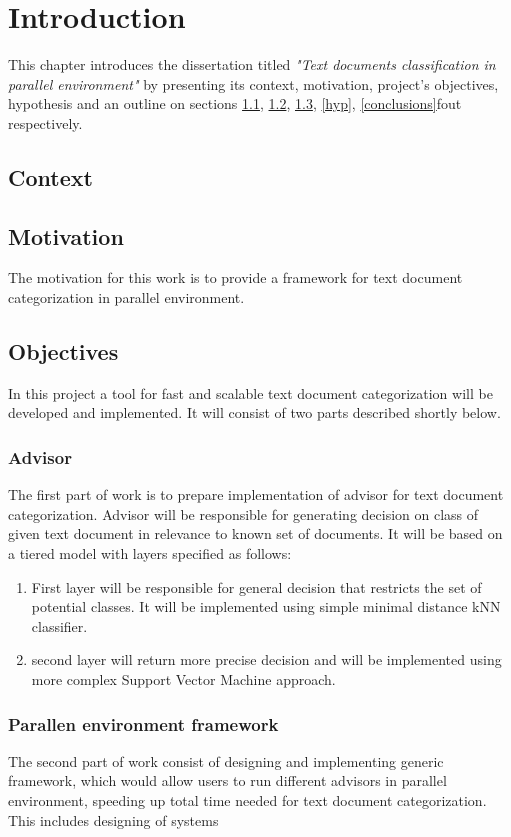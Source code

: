 \chapter{Introduction}
\label{int}

This chapter introduces the dissertation titled \textit{"Text documents classification in parallel environment"} by presenting its context, motivation, project’s objectives, hypothesis and an outline on sections \ref{con}, \ref{mot}, \ref{obj}, \ref{hyp}, \ref{conclusions}f{out} respectively.

\section{Context}
\label{con}


\section{Motivation}
\label{mot}
The motivation for this work is to provide a framework for text document categorization in parallel environment.

\section{Objectives}
\label{obj}
In this project a tool for fast and scalable text document categorization will be developed and implemented. It will consist of two parts described shortly below.
	\subsection{Advisor}
	The first part of work is to prepare implementation of advisor for text document categorization. Advisor will be responsible for generating decision on class of given text document in relevance to known set of documents. It will be based on a tiered model with layers specified as follows:
	\begin{enumerate}
		\item First layer will be responsible for general decision that restricts the set of potential classes. It will be implemented using simple minimal distance kNN classifier.
		\item second layer will return more precise decision and will be implemented using more complex Support Vector Machine approach.
	\end{enumerate}
	
	\subsection{Parallen environment framework}
	The second part of work consist of designing and implementing generic framework, which would allow users to run different advisors in parallel environment, speeding up total time needed for text document categorization. This includes designing of systems 

